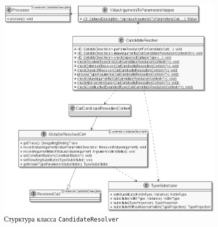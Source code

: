\begin{figure}[htbp]
    \centering
    \includegraphics[width=\textwidth]{resources/06/13_candidate_resolver.png}
    \caption{Стурктура класса \lstinline{CandidateResolver}}
    \label{fig:candidate-resolver}
\end{figure}

